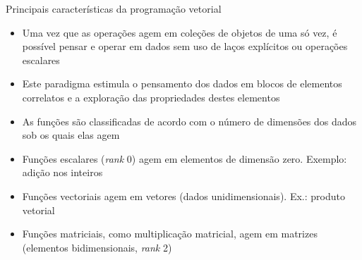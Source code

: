 \begin{frame}[fragile]{Principais características da programação vetorial}

    \begin{itemize}
        \item Uma vez que as operações agem em coleções de objetos de uma só vez, é possível pensar
            e operar em dados sem uso de laços explícitos ou operações escalares
        \pause

        \item Este paradigma estimula o pensamento dos dados em blocos de elementos correlatos e a
            exploração das propriedades destes elementos
        \pause


        \item As funções são classificadas de acordo com o número de dimensões dos dados sob os 
            quais elas agem
        \pause


        \item Funções escalares (\textit{rank} 0) agem em elementos de dimensão zero. Exemplo: 
            adição nos inteiros
        \pause

        \item Funções vectoriais agem em vetores (dados unidimensionais). Ex.: produto vetorial
        \pause

        \item Funções matriciais, como multiplicação matricial, agem em matrizes (elementos
            bidimensionais, \textit{rank} 2)
    \end{itemize}

\end{frame}
